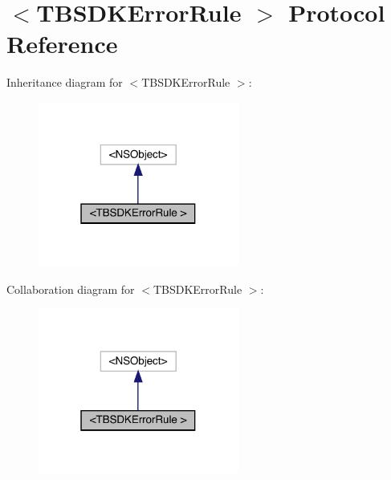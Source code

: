 \hypertarget{protocol_t_b_s_d_k_error_rule_01-p}{}\section{$<$T\+B\+S\+D\+K\+Error\+Rule $>$ Protocol Reference}
\label{protocol_t_b_s_d_k_error_rule_01-p}


Inheritance diagram for $<$T\+B\+S\+D\+K\+Error\+Rule $>$\+:\nopagebreak
\begin{figure}[H]
\begin{center}
\leavevmode
\includegraphics[width=187pt]{protocol_t_b_s_d_k_error_rule_01-p__inherit__graph}
\end{center}
\end{figure}


Collaboration diagram for $<$T\+B\+S\+D\+K\+Error\+Rule $>$\+:\nopagebreak
\begin{figure}[H]
\begin{center}
\leavevmode
\includegraphics[width=187pt]{protocol_t_b_s_d_k_error_rule_01-p__coll__graph}
\end{center}
\end{figure}
